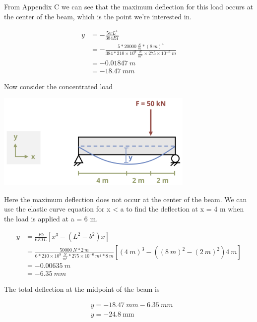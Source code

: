 \documentclass[
  letterpaper,
  DIV=11,
  numbers=noendperiod]{scrreprt}
\theoremstyle{definition}
\theoremstyle{remark}
\begin{document}
\begin{tcolorbox}
\begin{tcolorbox}
From Appendix C we can see that the maximum deflection for this load
occurs at the center of the beam, which is the point we're interested
in.

\[
\begin{aligned}
y&=-\frac{5 w L^4}{384EI} \\
&=-\frac{5*20000~\frac{N}{m}*(8{~m})^4}{384*210 \times 10^9~\frac{N}{m^2} \times 275 \times 10^{-6}{~m}} \\
& =-0.01847{~m} \\ 
& =-18.47{~mm}\end{aligned}
\]

Now consider the concentrated load

\begin{center}
\includegraphics[width=3.75in,height=\textheight]{images/CH11 PNGs/example11.5 copy 2.png}
\end{center}

Here the maximum deflection does not occur at the center of the beam. We
can use the elastic curve equation for x \textless{} a to find the
deflection at x = 4 m when the load is applied at a = 6 m.

\[
\begin{aligned}
y&=\frac{Fb}{6EIL}\left[x^3-\left(L^2-b^2\right) x\right]\\
&=\frac{50000{~N}*2{~m}}{6*210 \times 10^9~\frac{N}{m^2}*275 \times 10^{-6}{~m^4}* 8{~m}}\left[(4{~m})^3-\left((8{~m})^2-(2{~m})^2\right) 4{~m}\right] \\
& =-0.00635{~m} \\
& =-6.35{~mm}
\end{aligned}
\]

The total deflection at the midpoint of the beam is

\[
\begin{aligned} & y=-18.47{~mm}-6.35{~mm} \\ & y=-24.8 \mathrm{~mm}\end{aligned}
\]

\end{tcolorbox}

\end{tcolorbox}
\end{document}
